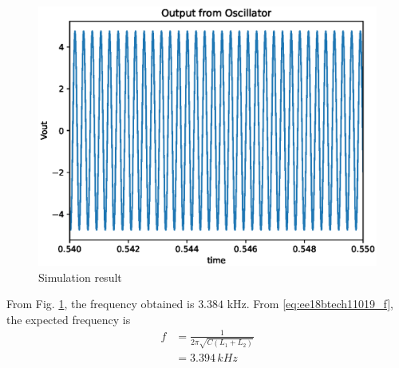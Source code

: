 \begin{enumerate}[label=\arabic*.,ref=\theenumi]
\begin{figure}[!ht]
\centering
\includegraphics[width=\columnwidth]{./figs/ee18btech11019_6.eps}
\caption{Simulation result}
\label{fig:ee18btech11019_plot_2}
\end{figure}
\renewcommand{\thefigure}{\theenumi}
%
From Fig. \ref{fig:ee18btech11019_plot_2},
the frequency obtained is $3.384$ kHz.  From \ref{eq:ee18btech11019_f}, 
the expected frequency is
\begin{align}
f   &= \frac{1}{2\pi \sqrt{C(L_1 +L_2)}}\\
    &= 3.394 \,kHz
\end{align}
\end{enumerate}
